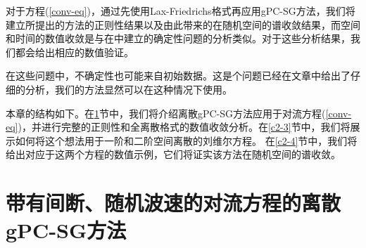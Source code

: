 
对于方程(\ref{conv-eq})，通过先使用Lax-Friedrichs格式再应用gPC-SG方法，我们将建立所提出的方法的正则性结果以及由此带来的在随机空间的谱收敛结果，而空间和时间的数值收敛是与在中建立的确定性问题的分析类似。对于这些分析结果，我们都会给出相应的数值验证。


在这些问题中，不确定性也可能来自初始数据。这是个问题已经在文章中给出了仔细的分析，我们的方法显然可以在这种情况下使用。


本章的结构如下。在\ref{c2-2}节中，我们将介绍离散gPC-SG方法应用于对流方程(\ref{conv-eq})，并进行完整的正则性和全离散格式的数值收敛分析。在\ref{c2-3}节中，我们将展示如何将这个想法用于一阶和二阶空间离散的刘维尔方程。
在\ref{c2-4}节中，我们将给出对应于这两个方程的数值示例，它们将证实该方法在随机空间的谱收敛。


\section{带有间断、随机波速的对流方程的离散gPC-SG方法}\label{c2-2}


